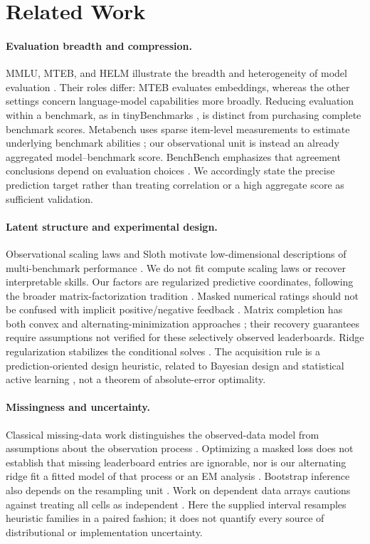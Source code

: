 \documentclass{article}
\begin{document}
\section{Related Work}
\paragraph{Evaluation breadth and compression.}
MMLU, MTEB, and HELM illustrate the breadth and heterogeneity of model evaluation \citep{MMLU,MTEB,HELM}. Their roles differ: MTEB evaluates embeddings, whereas the other settings concern language-model capabilities more broadly. Reducing evaluation within a benchmark, as in tinyBenchmarks \citep{Tiny}, is distinct from purchasing complete benchmark scores. Metabench uses sparse item-level measurements to estimate underlying benchmark abilities \citep{Metabench}; our observational unit is instead an already aggregated model--benchmark score. BenchBench emphasizes that agreement conclusions depend on evaluation choices \citep{BenchBench}. We accordingly state the precise prediction target rather than treating correlation or a high aggregate score as sufficient validation.

\paragraph{Latent structure and experimental design.}
Observational scaling laws and Sloth motivate low-dimensional descriptions of multi-benchmark performance \citep{Observational,Sloth}. We do not fit compute scaling laws or recover interpretable skills. Our factors are regularized predictive coordinates, following the broader matrix-factorization tradition \citep{Koren,PMF,BayesianMF}. Masked numerical ratings should not be confused with implicit positive/negative feedback \citep{Hu}. Matrix completion has both convex and alternating-minimization approaches \citep{CandesRecht,CandesTao,Keshavan,Mazumder,Jain}; their recovery guarantees require assumptions not verified for these selectively observed leaderboards. Ridge regularization stabilizes the conditional solves \citep{Hoerl}. The acquisition rule is a prediction-oriented design heuristic, related to Bayesian design and statistical active learning \citep{Chaloner,Cohn}, not a theorem of absolute-error optimality.

\paragraph{Missingness and uncertainty.}
Classical missing-data work distinguishes the observed-data model from assumptions about the observation process \citep{Rubin,Schafer}. Optimizing a masked loss does not establish that missing leaderboard entries are ignorable, nor is our alternating ridge fit a fitted model of that process or an EM analysis \citep{Dempster}. Bootstrap inference also depends on the resampling unit \citep{Efron}. Work on dependent data arrays cautions against treating all cells as independent \citep{Owen}. Here the supplied interval resamples heuristic families in a paired fashion; it does not quantify every source of distributional or implementation uncertainty.
\end{document}
